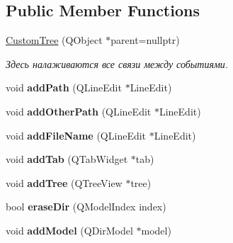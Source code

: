 \subsection*{Public Member Functions}
\begin{DoxyCompactItemize}
\item 
\mbox{\label{class_custom_tree_a8bdf32ee5de09eef817afec6e721a309}} 
\hyperlink{class_custom_tree_a8bdf32ee5de09eef817afec6e721a309}{Custom\+Tree} (Q\+Object $\ast$parent=nullptr)
\begin{DoxyCompactList}\small\item\em Здесь налаживаются все связи между событиями. \end{DoxyCompactList}\item 
\mbox{\label{class_custom_tree_ab276e0f77be6238627b0f12186407bc6}} 
void {\bfseries add\+Path} (Q\+Line\+Edit $\ast$Line\+Edit)
\item 
\mbox{\label{class_custom_tree_acc5b99990df42d12c48bc67f8e099455}} 
void {\bfseries add\+Other\+Path} (Q\+Line\+Edit $\ast$Line\+Edit)
\item 
\mbox{\label{class_custom_tree_a045dd1fa2368a162ac7dabb326f4f256}} 
void {\bfseries add\+File\+Name} (Q\+Line\+Edit $\ast$Line\+Edit)
\item 
\mbox{\label{class_custom_tree_ad9a3782f13e222a141aeafade2edfc61}} 
void {\bfseries add\+Tab} (Q\+Tab\+Widget $\ast$tab)
\item 
\mbox{\label{class_custom_tree_af43b1fea3a6597175cd1c227c77e916e}} 
void {\bfseries add\+Tree} (Q\+Tree\+View $\ast$tree)
\item 
\mbox{\label{class_custom_tree_a48fe77a51f2ec17c6f6688b51c0a3a54}} 
bool {\bfseries erase\+Dir} (Q\+Model\+Index index)
\item 
\mbox{\label{class_custom_tree_a0de6a7896af48da2a1a7ee4e84851576}} 
void {\bfseries add\+Model} (Q\+Dir\+Model $\ast$model)
\item 
\mbox{\label{class_custom_tree_a004e09ac9843c95093be3087fa7b4224}} 

\end{DoxyCompactItemize}
